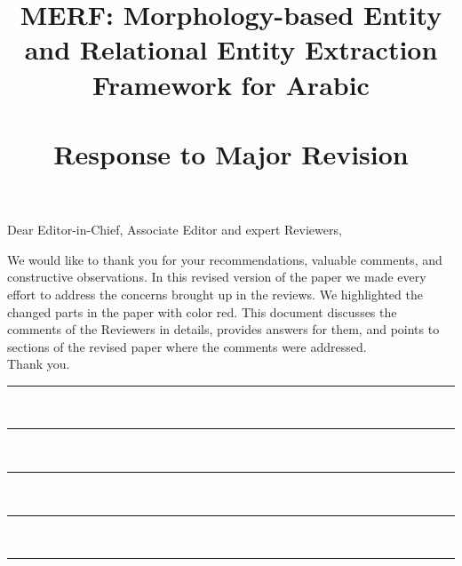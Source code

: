 \documentclass[11pt]{article}
\title{MERF: Morphology-based Entity and Relational Entity Extraction Framework for Arabic
 \\
~~ \\
  Response to Major Revision }
\date{}
\begin{document}
\maketitle

{\noindent Dear Editor-in-Chief, Associate Editor and expert Reviewers,}

We would like to thank you for your recommendations, valuable comments, 
and constructive observations. 
%
In this revised version of the paper we made every effort to address the 
concerns brought up in the reviews. 
%
We highlighted the changed parts in the paper with color red. 
This document discusses the comments of the Reviewers 
in details, provides answers for them, and points to sections of the revised 
paper where the comments were addressed. 
\\
\noindent
Thank you.
\newline
\newline
\hrule
\newpage


~\newline
\hrule


~\newline
\hrule


~\newline
\hrule


~\newline
\hrule



%

%
\end{document}

